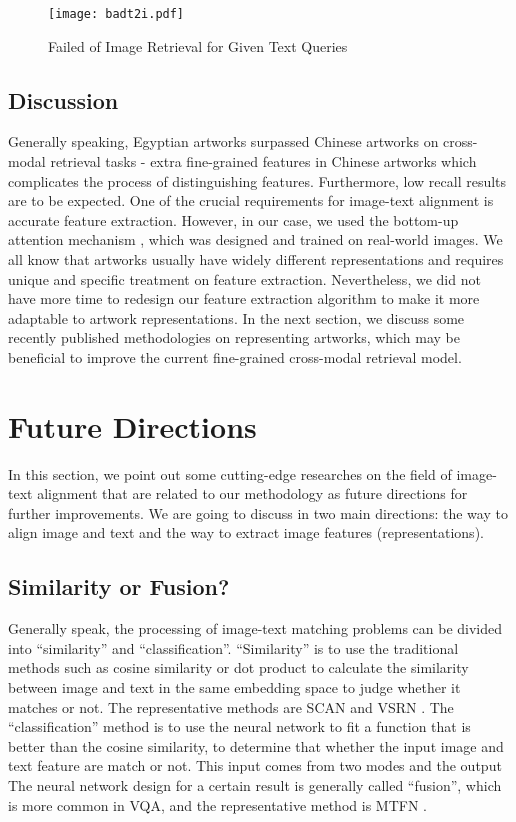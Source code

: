 \begin{figure}[h!]
\centering
\texttt{[image: badt2i.pdf]}
\caption{Failed of Image Retrieval for Given Text Queries
}
\label{fig:badt2i}
\end{figure}

\subsection{Discussion}

Generally speaking, Egyptian artworks surpassed Chinese artworks on cross-modal retrieval tasks - extra fine-grained features in Chinese artworks which complicates the process of distinguishing features. Furthermore, low recall results are to be expected. One of the crucial requirements for image-text alignment is accurate feature extraction. However, in our case, we used the bottom-up attention mechanism \cite{bottomup}, which was designed and trained on real-world images. We all know that artworks usually have widely different representations and requires unique and specific treatment on feature extraction. Nevertheless, we did not have more time to redesign our feature extraction algorithm to make it more adaptable to artwork representations. In the next section, we discuss some recently published methodologies on representing artworks, which may be beneficial to improve the current fine-grained cross-modal retrieval model. 

\section{Future Directions}
In this section, we point out some cutting-edge researches on the field of image-text alignment that are related to our methodology as future directions for further improvements. We are going to discuss in two main directions: the way to align image and text and the way to extract image features (representations).

\subsection{Similarity or Fusion?}

Generally speak, the processing of image-text matching problems can be divided into ``similarity'' and ``classification''. ``Similarity'' is to use the traditional methods such as cosine similarity or dot product to calculate the similarity between image and text in the same embedding space to judge whether it matches or not. The representative methods are SCAN \cite{scan} and VSRN \cite{VSRN}. The ``classification'' method is to use the neural network to fit a function that is better than the cosine similarity, to determine that whether the input image and text feature are match or not. This input comes from two modes and the output The neural network design for a certain result is generally called ``fusion'', which is more common in VQA, and the representative method is MTFN \cite{MTFN}.

